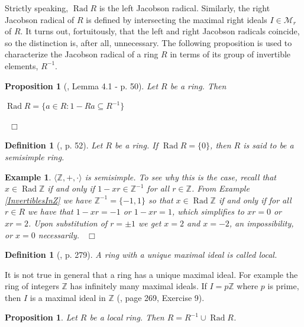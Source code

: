 \documentclass[12pt, oneside]{book}
\newtheorem{proposition}[theorem]{Proposition}
\newtheorem{example}[theorem]{Example}
\newtheorem{definition}[theorem]{Definition}
\newcommand{\qed}{\hfill ~$\Box$\\}
\def\Rad{\operatorname{Rad}}
\begin{document}
\noindent Strictly speaking, $\Rad R$ is the left Jacobson radical. 
Similarly, the right Jacobson radical of $R$ is defined by intersecting the maximal right ideals $I \in \mathcal{M}_r$ of $R$. 
It turns out, fortuitously, that the left and right Jacobson radicals coincide, so the distinction is, after all, unnecessary.
\vskip 0.3cm
\noindent The following proposition is used to characterize the Jacobson radical of a ring $R$ in terms of its group of invertible elements, $R^{-1}$.
\begin{proposition}[\cite{L1}, Lemma 4.1 - p. 50] \label{RadCharacter}
\normalfont
Let $R$ be a ring. Then
\begin{center}
$\Rad R=\{a \in R: 1-Ra \subseteq R^{-1}\}$ 
\end{center}
\qed
\end{proposition}

\vskip -3cm
\begin{definition}[\cite{L1}, p. 52] \label{dfnSemisimpleRing}
\normalfont
\noindent Let $R$ be a ring. If $\Rad R=\{0\}$, then $R$ is said to be a {\sl semisimple} ring.

\end{definition}

\begin{example} \label{ZisSemisimple}
\normalfont
\noindent $\langle \mathbb{Z}, +,  \cdot \rangle$ is semisimple. To see why this is the case,
 recall that $x \in \Rad \mathbb{Z}$ if and only if $1-xr \in \mathbb{Z}^{-1}$ for all 
$r \in \mathbb{Z}$. From Example \ref{InvertiblesInZ} we have $\mathbb{Z}^{-1}=\{-1,1\}$ 
so that $x\in \Rad \mathbb{Z}$ if and only if 
for all $r \in R$ we have that $1-xr=-1$ or $1-xr=1$, which simplifies to $xr=0$ or $xr=2$. 
Upon substitution of $r=\pm 1$ we get $x=2$ and $x=-2$, an impossibility, or $x=0$ necessarily.
\qed
\end{example}


\begin{definition}[\cite{L1}, p. 279] \label{dfnLocalRing}
\normalfont
\noindent A ring with a unique maximal ideal is called {\sl local}.
\end{definition}
\normalfont
\noindent It is not true in general that a ring has a unique maximal ideal. 
For example the ring of integers $\mathbb{Z}$ has infinitely many maximal ideals. If $I = p\mathbb{Z}$  where $p$ is prime, then $I$ is a maximal ideal in $\mathbb{Z}$ (\cite{G}, page 269, Exercise 9).

\begin{proposition} \label{chrLocalRing}
\normalfont
Let $R$ be a local ring. Then $R=R^{-1} \cup \Rad R$.

\end{proposition}
\end{document}
